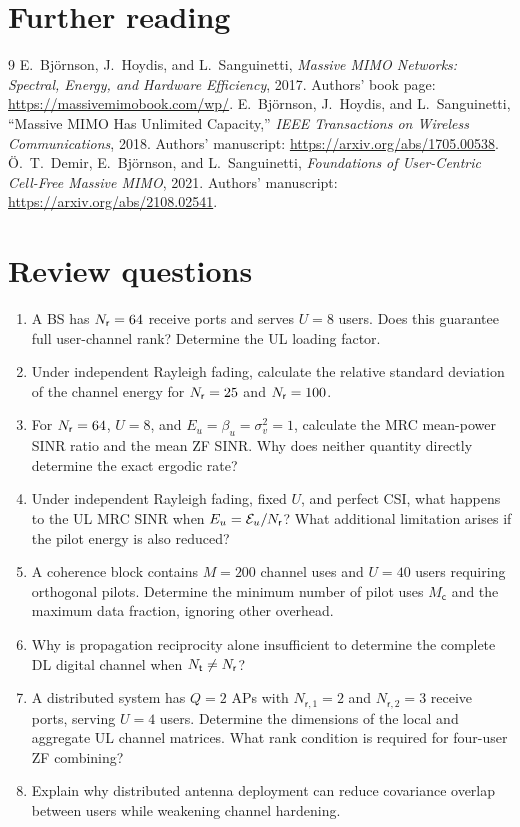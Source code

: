 \section*{Further reading}
\begin{thebibliography}{9}
 E.~Bj\"ornson, J.~Hoydis, and L.~Sanguinetti, \emph{Massive MIMO Networks: Spectral, Energy, and Hardware Efficiency}, 2017. Authors' book page: \url{https://massivemimobook.com/wp/}.
 E.~Bj\"ornson, J.~Hoydis, and L.~Sanguinetti, ``Massive MIMO Has Unlimited Capacity,'' \emph{IEEE Transactions on Wireless Communications}, 2018. Authors' manuscript: \url{https://arxiv.org/abs/1705.00538}.
 \"O.~T.~Demir, E.~Bj\"ornson, and L.~Sanguinetti, \emph{Foundations of User-Centric Cell-Free Massive MIMO}, 2021. Authors' manuscript: \url{https://arxiv.org/abs/2108.02541}.
\end{thebibliography}
\appendix
\clearpage

\section*{Review questions}
\begin{enumerate}[label=\textbf{E\arabic*.}]
	\item A BS has $N_{\mathsf{r}}=64$ receive ports and serves $U=8$ users. Does this guarantee full user-channel rank? Determine the UL loading factor.
	
	\item Under independent Rayleigh fading, calculate the relative standard deviation of the channel energy for $N_{\mathsf{r}}=25$ and $N_{\mathsf{r}}=100$.
	
	\item For $N_{\mathsf{r}}=64$, $U=8$, and $E_u=\beta_u=\sigma_v^2=1$, calculate the MRC mean-power SINR ratio and the mean ZF SINR. Why does neither quantity directly determine the exact ergodic rate?
	
	\item Under independent Rayleigh fading, fixed $U$, and perfect CSI, what happens to the UL MRC SINR when $E_u=\mathcal E_u/N_{\mathsf{r}}$? What additional limitation arises if the pilot energy is also reduced?
	
	\item A coherence block contains $M=200$ channel uses and $U=40$ users requiring orthogonal pilots. Determine the minimum number of pilot uses $M_{\mathsf c}$ and the maximum data fraction, ignoring other overhead.
	
	\item Why is propagation reciprocity alone insufficient to determine the complete DL digital channel when $N_{\mathsf{t}}\ne N_{\mathsf{r}}$?
	
	\item A distributed system has $Q=2$ APs with $N_{\mathsf r,1}=2$ and $N_{\mathsf r,2}=3$ receive ports, serving $U=4$ users. Determine the dimensions of the local and aggregate UL channel matrices. What rank condition is required for four-user ZF combining?
	
	\item Explain why distributed antenna deployment can reduce covariance overlap between users while weakening channel hardening.
\end{enumerate}

